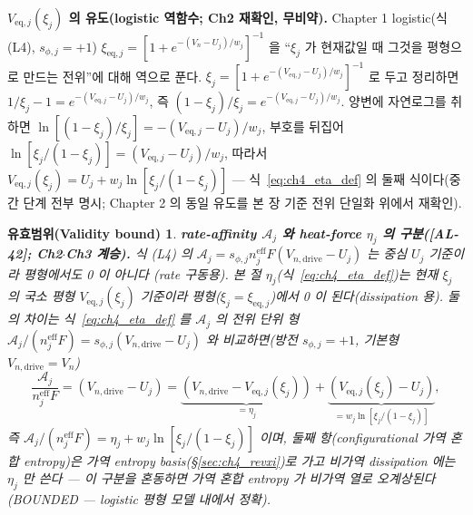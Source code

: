 \documentclass[11pt,a4paper]{article}
\newtheorem*{boundbox}{유효범위(Validity bound)}
\newcommand{\eff}{\mathrm{eff}}
\newcommand{\eq}{\mathrm{eq}}
\newcommand{\drive}{\mathrm{drive}}
\newcommand{\AL}[1]{\textsf{[AL-#1]}}
\begin{document}
\textbf{$V_{\eq,j}(\xi_j)$ 의 유도(logistic 역함수; Ch2 재확인, 무비약).} Chapter 1 logistic(식 (L4),
$s_{\phi,j}=+1$) $\xi_{\eq,j}=[1+e^{-(V_n-U_j)/w_j}]^{-1}$ 을 ``$\xi_j$ 가 현재값일 때 그것을 평형으로 만드는
전위''에 대해 역으로 푼다. $\xi_j=[1+e^{-(V_{\eq,j}-U_j)/w_j}]^{-1}$ 로 두고 정리하면 $1/\xi_j-1=
e^{-(V_{\eq,j}-U_j)/w_j}$, 즉 $(1-\xi_j)/\xi_j=e^{-(V_{\eq,j}-U_j)/w_j}$. 양변에 자연로그를 취하면
$\ln[(1-\xi_j)/\xi_j]=-(V_{\eq,j}-U_j)/w_j$, 부호를 뒤집어 $\ln[\xi_j/(1-\xi_j)]=(V_{\eq,j}-U_j)/w_j$, 따라서
$V_{\eq,j}(\xi_j)=U_j+w_j\ln[\xi_j/(1-\xi_j)]$ — 식~\eqref{eq:ch4_eta_def} 의 둘째 식이다(중간 단계 전부 명시;
Chapter 2 의 동일 유도를 본 장 기준 전위 단일화 위에서 재확인).
\begin{boundbox}
\textbf{rate-affinity $\mathcal A_j$ 와 heat-force $\eta_j$ 의 구분(\AL{42}; Ch2$\cdot$Ch3 계승).} 식 (L4) 의
$\mathcal A_j=s_{\phi,j}n_j^{\eff}F(V_{n,\drive}-U_j)$ 는 \emph{중심} $U_j$ 기준이라 평형에서도 0 이 아니다
(rate 구동용). 본 절 $\eta_j$(식~\eqref{eq:ch4_eta_def})는 \emph{현재} $\xi_j$ 의 국소 평형 $V_{\eq,j}(\xi_j)$
기준이라 평형($\xi_j=\xi_{\eq,j}$)에서 0 이 된다(dissipation 용). 둘의 차이는 식~\eqref{eq:ch4_eta_def} 를
$\mathcal A_j$ 의 전위 단위 형 $\mathcal A_j/(n_j^{\eff}F)=s_{\phi,j}(V_{n,\drive}-U_j)$ 와 비교하면(방전
$s_{\phi,j}=+1$, 기본형 $V_{n,\drive}=V_n$)
\[
\frac{\mathcal A_j}{n_j^{\eff}F}=(V_{n,\drive}-U_j)
=\underbrace{(V_{n,\drive}-V_{\eq,j}(\xi_j))}_{=\eta_j}
+\underbrace{(V_{\eq,j}(\xi_j)-U_j)}_{=w_j\ln[\xi_j/(1-\xi_j)]},
\]
즉 $\mathcal A_j/(n_j^{\eff}F)=\eta_j+w_j\ln[\xi_j/(1-\xi_j)]$ 이며, 둘째 항(configurational 가역 혼합 entropy)은
\emph{가역} entropy basis(\S\ref{sec:ch4_revxi})로 가고 \emph{비가역} dissipation 에는 $\eta_j$ 만 쓴다 — 이
구분을 혼동하면 가역 혼합 entropy 가 비가역 열로 오계상된다(BOUNDED — logistic 평형 모델 내에서 정확).
\end{boundbox}

\end{document}
